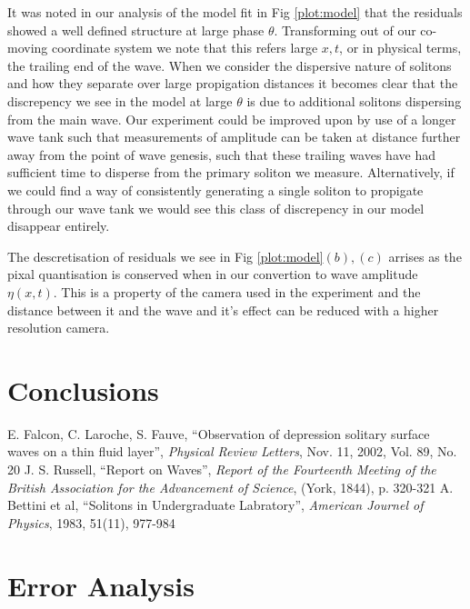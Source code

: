 \documentclass[10pt, twocolumn]{revtex4}    %
\begin{document}
It was noted in our analysis of the model fit in Fig \ref{plot:model} that the residuals showed a well defined structure at large phase $\theta$.
Transforming out of our co-moving coordinate system we note that this refers large $x, t$, or in physical terms, the trailing end of the wave.
When we consider the dispersive nature of solitons and how they separate over large propigation distances it becomes clear that the discrepency we see in the model at large $\theta$ is due to additional solitons dispersing from the main wave.
Our experiment could be improved upon by use of a longer wave tank such that measurements of amplitude can be taken at distance further away from the point of wave genesis, such that these trailing waves have had sufficient time to disperse from the primary soliton we measure.
Alternatively, if we could find a way of consistently generating a single soliton to propigate through our wave tank we would see this class of discrepency in our model disappear entirely.

The descretisation of residuals we see in Fig \ref{plot:model}$(b), (c)$ arrises as the pixal quantisation is conserved when in our convertion to wave amplitude $\eta(x, t)$.
This is a property of the camera used in the experiment and the distance between it and the wave and it's effect can be reduced with a higher resolution camera.






\section{Conclusions}


\begin{thebibliography}{}
 E. Falcon, C. Laroche, S. Fauve, ``Observation of depression solitary surface waves on a thin fluid layer'', \textit{Physical Review Letters}, Nov. 11, 2002, Vol. 89, No. 20
 J. S. Russell, ``Report on Waves'', \textit{Report of the Fourteenth Meeting of the British Association for the Advancement of Science}, (York, 1844), p. 320-321
 A. Bettini et al, ``Solitons in Undergraduate Labratory'', \textit{American Journel of Physics}, 1983, 51(11), 977-984


\end{thebibliography}

\clearpage
\appendix

\section{Error Analysis}
\end{document}
